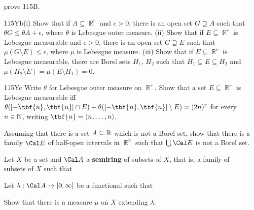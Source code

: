 {

\noindent prove 115B.   

\spheader 115Yb(i)
Show that if $A\subseteq\BbbR^r$ and $\epsilon>0$, there is
an open set $G\supseteq A$ such that $\theta G\le\theta A+\epsilon$,
where $\theta$ is Lebesgue outer measure.   (ii) Show that if
$E\subseteq\BbbR^r$ is Lebesgue measurable and $\epsilon>0$, there is an
open set $G\supseteq E$ such that $\mu(G\setminus E)\le\epsilon$, where
$\mu$ is Lebesgue measure.      (iii) Show that if $E\subseteq\BbbR^r$ is Lebesgue
measurable, there are Borel sets $H_1$, $H_2$ such that $H_1\subseteq
E\subseteq H_2$ and $\mu(H_2\setminus E)=\mu(E\setminus H_1)=0$.

\spheader 115Yc Write $\theta$ for Lebesgue outer measure on
$\BbbR^r$.   Show
that a set $E\subseteq\BbbR^r$ is Lebesgue measurable iff
$\theta([-\tbf{n},\tbf{n}]\cap E)+\theta([-\tbf{n},\tbf{n}]\setminus
E)=(2n)^r$ for every $n\in\Bbb N$, writing $\tbf{n}=(n,\ldots,n)$.   

 Assuming that there is a set $A\subseteq\Bbb R$
which is not a Borel set, show that there is a family $\Cal E$ of
half-open intervals in $\BbbR^2$ such that $\bigcup\Cal E$ is not a
Borel set.   

 Let $X$ be a set and $\Cal A$ a {\bf semiring} of
subsets of $X$, that is, a family of subsets of $X$ such that




\noindent Let $\lambda:\Cal A\to[0,\infty]$ be a functional such that



\noindent Show that there is a measure $\mu$ on $X$ extending $\lambda$.
}%

